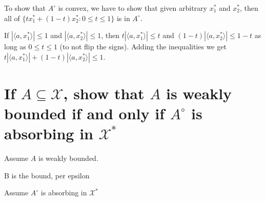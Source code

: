 \documentclass{article}
\begin{document}
To show that $A^{\circ}$ is convex, we have to show that given arbitrary $x_1^*$ and $x_2^*$, then all of $\{t x_1^* + (1-t) x_2^* :0\le t \le 1\}$ is in $A^{\circ}$.

If $|\langle a, x_1^*\rangle | \le 1$ and $|\langle a, x_2^*\rangle | \le 1$, then $t|\langle a, x_1^*\rangle | \le t$ and $(1-t)|\langle a, x_2^*\rangle | \le 1-t$ as long as $0 \le t \le 1$ (to not flip the signs). Adding the inequalities we get $t|\langle a, x_1^*\rangle | +(1-t)|\langle a, x_2^*\rangle | \le 1$.

\section{If $A\subseteq\mathscr{X}$, show that $A$ is weakly bounded if and only if $A^{\circ}$ is absorbing in $\mathscr{X}^*$}

Assume $A$ is weakly bounded. 

B is the bound, per epsilon


Assume $A^{\circ}$ is absorbing in $\mathscr{X}^*$
\end{document}
